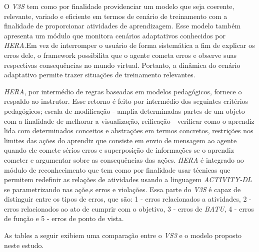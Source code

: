 O \textit{V3S} tem como por finalidade providenciar um modelo que seja coerente, relevante, variado e eficiente em termos de cenário de treinamento com a finalidade de proporcionar atividades de aprendizagem. Esse modelo também apresenta um módulo que monitora cenários adaptativos conhecidos por \textit{HERA}.Em vez de interromper o usuário de forma sistemática a fim de explicar os erros dele, o framework possibilita que o agente cometa erros e observe suas respectivas consequências no mundo virtual. Portanto, a dinâmica do cenário adaptativo permite trazer situações de treinamento relevantes. 

\textit{HERA}, por intermédio de regras baseadas em modelos pedagógicos, fornece o respaldo ao instrutor. Esse retorno é feito por intermédio dos seguintes critérios pedagógicos; escala de modificação - amplia determinadas partes de um objeto com a finalidade de melhorar a visualização, reificação - verificar como o aprendiz lida com determinados conceitos e abstrações em termos concretos, restrições nos limites das ações do aprendiz que consiste em envio de mensagem ao agente quando ele comete sérios erros e superposição de informações se o aprendiz cometer e argumentar sobre as consequências das ações. \textit{HERA} é integrado ao módulo de reconhecimento que tem como por finalidade usar técnicas que permitem redefinir as relações de atividades usando a linguagem \textit{ACTIVITY-DL} se parametrizando nas açõe,s erros e violações. Essa parte do \textit{V3S} é capaz de distinguir entre os tipos de erros, que são: 1 - erros relacionados a atividades, 2 - erros relacionados ao ato de cumprir com o objetivo, 3 - erros de \textit{BATU}, 4 - erros de função e 5 - erros de ponto de vista.

As tables a seguir exibiem uma comparação entre o \textit{VS3} e o modelo proposto neste estudo.

